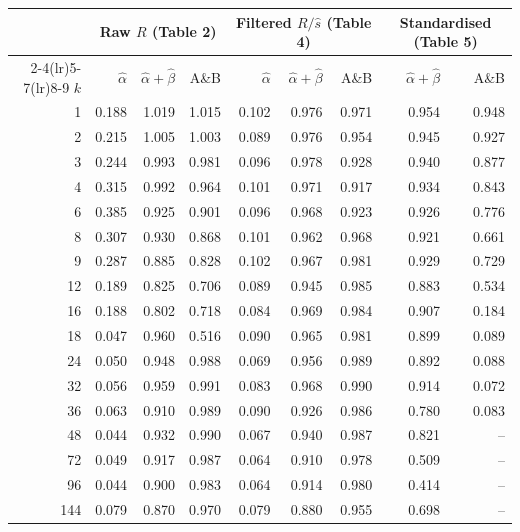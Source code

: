 \begin{tabular}{rrrrrrrrr}
\toprule
 & \multicolumn{3}{c}{Raw $R$ (Table 2)} & \multicolumn{3}{c}{Filtered $R/\hat s$ (Table 4)} & \multicolumn{2}{c}{Standardised (Table 5)} \\
\cmidrule(lr){2-4}\cmidrule(lr){5-7}\cmidrule(lr){8-9}
$k$ & $\hat\alpha$ & $\hat\alpha+\hat\beta$ & A\&B & $\hat\alpha$ & $\hat\alpha+\hat\beta$ & A\&B & $\hat\alpha+\hat\beta$ & A\&B \\
\midrule
1 & 0.188 & 1.019 & 1.015 & 0.102 & 0.976 & 0.971 & 0.954 & 0.948 \\
2 & 0.215 & 1.005 & 1.003 & 0.089 & 0.976 & 0.954 & 0.945 & 0.927 \\
3 & 0.244 & 0.993 & 0.981 & 0.096 & 0.978 & 0.928 & 0.940 & 0.877 \\
4 & 0.315 & 0.992 & 0.964 & 0.101 & 0.971 & 0.917 & 0.934 & 0.843 \\
6 & 0.385 & 0.925 & 0.901 & 0.096 & 0.968 & 0.923 & 0.926 & 0.776 \\
8 & 0.307 & 0.930 & 0.868 & 0.101 & 0.962 & 0.968 & 0.921 & 0.661 \\
9 & 0.287 & 0.885 & 0.828 & 0.102 & 0.967 & 0.981 & 0.929 & 0.729 \\
12 & 0.189 & 0.825 & 0.706 & 0.089 & 0.945 & 0.985 & 0.883 & 0.534 \\
16 & 0.188 & 0.802 & 0.718 & 0.084 & 0.969 & 0.984 & 0.907 & 0.184 \\
18 & 0.047 & 0.960 & 0.516 & 0.090 & 0.965 & 0.981 & 0.899 & 0.089 \\
24 & 0.050 & 0.948 & 0.988 & 0.069 & 0.956 & 0.989 & 0.892 & 0.088 \\
32 & 0.056 & 0.959 & 0.991 & 0.083 & 0.968 & 0.990 & 0.914 & 0.072 \\
36 & 0.063 & 0.910 & 0.989 & 0.090 & 0.926 & 0.986 & 0.780 & 0.083 \\
48 & 0.044 & 0.932 & 0.990 & 0.067 & 0.940 & 0.987 & 0.821 & -- \\
72 & 0.049 & 0.917 & 0.987 & 0.064 & 0.910 & 0.978 & 0.509 & -- \\
96 & 0.044 & 0.900 & 0.983 & 0.064 & 0.914 & 0.980 & 0.414 & -- \\
144 & 0.079 & 0.870 & 0.970 & 0.079 & 0.880 & 0.955 & 0.698 & -- \\
\bottomrule
\end{tabular}